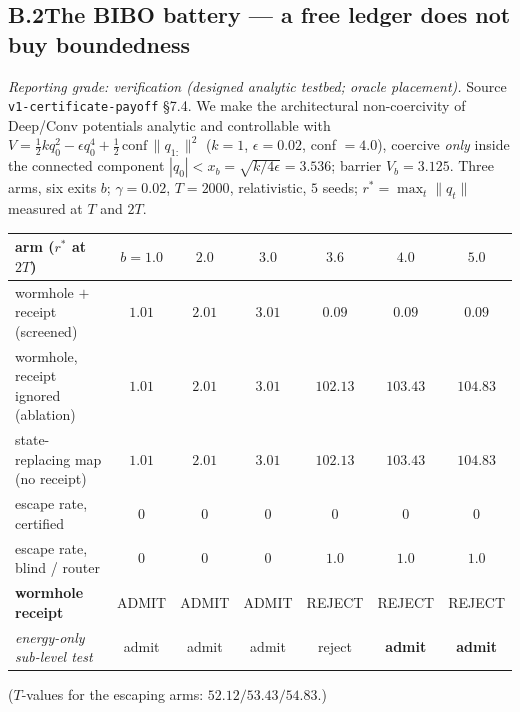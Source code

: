 \documentclass[11pt]{article}
\newcommand{\half}{\tfrac12}
\begin{document}
\subsection*{B.2\quad The BIBO battery --- a free ledger does not buy boundedness}
\emph{Reporting grade: verification (designed analytic testbed; oracle placement).} Source \texttt{v1-certificate-payoff} \S7.4. We make the architectural non-coercivity of Deep/Conv potentials analytic and controllable with $V=\half kq_0^2-\epsilon q_0^4+\half\,\mathrm{conf}\,\|q_{1:}\|^2$ ($k=1$, $\epsilon=0.02$, conf $=4.0$), coercive \emph{only} inside the connected component $|q_0|<x_b=\sqrt{k/4\epsilon}=3.536$; barrier $V_b=3.125$. Three arms, six exits $b$; $\gamma=0.02$, $T=2000$, relativistic, $5$ seeds; $r^\ast=\max_t\|q_t\|$ measured at $T$ and $2T$.

\begin{center}\small
\begin{tabular}{lcccccc}
\toprule
arm ($r^\ast$ at $2T$) & $b{=}1.0$ & $2.0$ & $3.0$ & $3.6$ & $4.0$ & $5.0$ \\
\midrule
wormhole $+$ receipt (screened) & $1.01$ & $2.01$ & $3.01$ & $\mathbf{0.09}$ & $\mathbf{0.09}$ & $\mathbf{0.09}$ \\
wormhole, receipt ignored (ablation) & $1.01$ & $2.01$ & $3.01$ & $\mathbf{102.13}$ & $\mathbf{103.43}$ & $\mathbf{104.83}$ \\
state-replacing map (no receipt) & $1.01$ & $2.01$ & $3.01$ & $\mathbf{102.13}$ & $\mathbf{103.43}$ & $\mathbf{104.83}$ \\
\midrule
escape rate, certified & $0$ & $0$ & $0$ & $0$ & $0$ & $0$ \\
escape rate, blind / router & $0$ & $0$ & $0$ & $1.0$ & $1.0$ & $1.0$ \\
\textbf{wormhole receipt} & ADMIT & ADMIT & ADMIT & REJECT & REJECT & REJECT \\
\emph{energy-only sub-level test} & admit & admit & admit & reject & \textbf{admit} & \textbf{admit} \\
\bottomrule
\end{tabular}
\end{center}
($T$-values for the escaping arms: $52.12/53.43/54.83$.)
\end{document}
